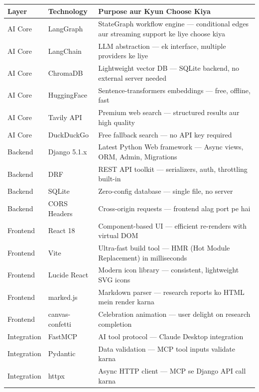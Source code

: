 \documentclass[11pt,a4paper,twoside]{report}
\begin{document}
\begin{longtable}{|p{2.5cm}|p{3.5cm}|p{7cm}|}
\hline
\textbf{Layer} & \textbf{Technology} & \textbf{Purpose aur Kyun Choose Kiya} \\
\hline
\endhead
AI Core & LangGraph & StateGraph workflow engine --- conditional edges aur streaming support ke liye choose kiya \\
\hline
AI Core & LangChain & LLM abstraction --- ek interface, multiple providers ke liye \\
\hline
AI Core & ChromaDB & Lightweight vector DB --- SQLite backend, no external server needed \\
\hline
AI Core & HuggingFace & Sentence-transformers embeddings --- free, offline, fast \\
\hline
AI Core & Tavily API & Premium web search --- structured results aur high quality \\
\hline
AI Core & DuckDuckGo & Free fallback search --- no API key required \\
\hline
Backend & Django 5.1.x & Latest Python Web framework --- Async views, ORM, Admin, Migrations \\
\hline
Backend & DRF & REST API toolkit --- serializers, auth, throttling built-in \\
\hline
Backend & SQLite & Zero-config database --- single file, no server \\
\hline
Backend & CORS Headers & Cross-origin requests --- frontend alag port pe hai \\
\hline
Frontend & React 18 & Component-based UI --- efficient re-renders with virtual DOM \\
\hline
Frontend & Vite & Ultra-fast build tool --- HMR (Hot Module Replacement) in milliseconds \\
\hline
Frontend & Lucide React & Modern icon library --- consistent, lightweight SVG icons \\
\hline
Frontend & marked.js & Markdown parser --- research reports ko HTML mein render karna \\
\hline
Frontend & canvas-confetti & Celebration animation --- user delight on research completion \\
\hline
Integration & FastMCP & AI tool protocol --- Claude Desktop integration \\
\hline
Integration & Pydantic & Data validation --- MCP tool inputs validate karna \\
\hline
Integration & httpx & Async HTTP client --- MCP se Django API call karna \\
\hline
\end{longtable}
\end{document}
